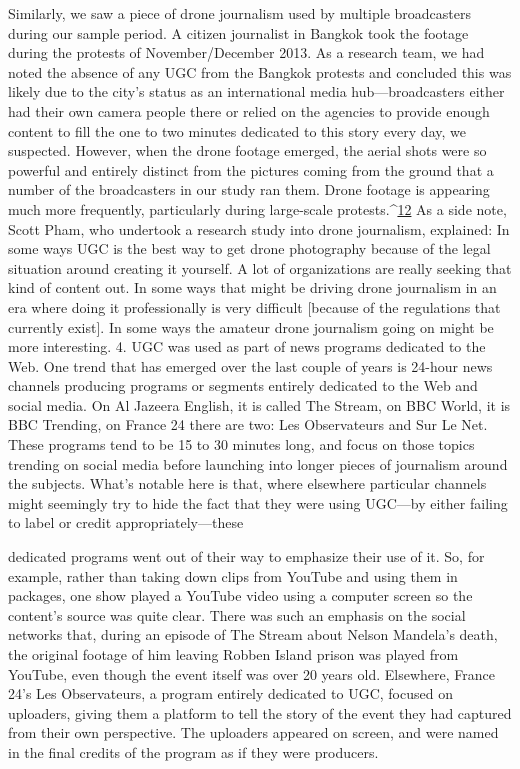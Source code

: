\begin{enumerate}
Similarly, we saw a piece of drone journalism used by multiple broadcasters
during our sample period. A citizen journalist in Bangkok took the
footage during the protests of November/December 2013. As a research
team, we had noted the absence of any UGC from the Bangkok protests and
concluded this was likely due to the city's status as an international media
hub—broadcasters either had their own camera people there or relied on
the agencies to provide enough content to fill the one to two minutes dedicated
to this story every day, we suspected. However, when the drone footage
emerged, the aerial shots were so powerful and entirely distinct from
the pictures coming from the ground that a number of the broadcasters
in our study ran them. Drone footage is appearing much more frequently,
particularly during large-scale protests.^{\href{#endnotes}{12}} As a side note, Scott Pham, who
undertook a research study into drone journalism, explained:
In some ways UGC is the best way to get drone photography because
of the legal situation around creating it yourself. A lot of organizations
are really seeking that kind of content out. In some ways that
might be driving drone journalism in an era where doing it professionally
is very difficult [because of the regulations that currently
exist]. In some ways the amateur drone journalism going on might
be more interesting.
4. UGC was used as part of news programs dedicated to the Web.
One trend that has emerged over the last couple of years is 24-hour news
channels producing programs or segments entirely dedicated to the Web
and social media. On Al Jazeera English, it is called The Stream, on BBC
World, it is BBC Trending, on France 24 there are two: Les Observateurs and
Sur Le Net. These programs tend to be 15 to 30 minutes long, and focus on
those topics trending on social media before launching into longer pieces
of journalism around the subjects. What's notable here is that, where elsewhere
particular channels might seemingly try to hide the fact that they
were using UGC—by either failing to label or credit appropriately—these

dedicated programs went out of their way to emphasize their use of it. So,
for example, rather than taking down clips from YouTube and using them in
packages, one show played a YouTube video using a computer screen so the
content's source was quite clear. There was such an emphasis on the social
networks that, during an episode of The Stream about Nelson Mandela's
death, the original footage of him leaving Robben Island prison was played
from YouTube, even though the event itself was over 20 years old.
Elsewhere, France 24's Les Observateurs, a program entirely dedicated to
UGC, focused on uploaders, giving them a platform to tell the story of
the event they had captured from their own perspective. The uploaders
appeared on screen, and were named in the final credits of the program as
if they were producers.

\end{enumerate}
